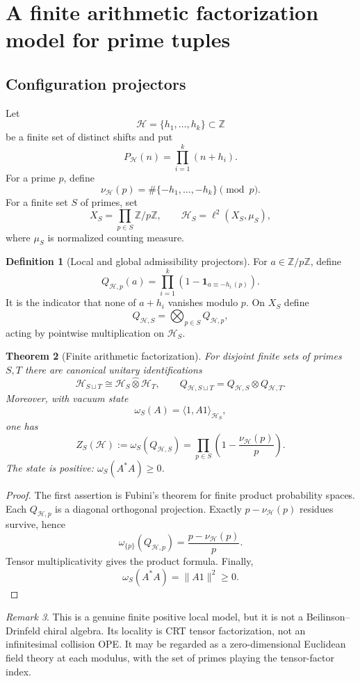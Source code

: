 \documentclass[11pt]{article}
\newtheorem{theorem}{Theorem}[section]
\theoremstyle{definition}
\newtheorem{definition}[theorem]{Definition}
\theoremstyle{remark}
\newtheorem{remark}[theorem]{Remark}
\newcommand{\ZZ}{\mathbb Z}
\newcommand{\HH}{\mathcal H}
\newcommand{\1}{\mathbf 1}
\newcommand{\cH}{\mathcal H}
\begin{document}
\section{A finite arithmetic factorization model for prime tuples}

\subsection{Configuration projectors}

Let
\[
\cH=\{h_1,\ldots,h_k\}\subset\ZZ
\]
be a finite set of distinct shifts and put
\[
P_{\cH}(n)=\prod_{i=1}^k(n+h_i).
\]
For a prime $p$, define
\[
\nu_{\cH}(p)=\#\{-h_1,\ldots,-h_k\}\pmod p.
\]
For a finite set $S$ of primes, set
\[
X_S=\prod_{p\in S}\ZZ/p\ZZ,
\qquad
\HH_S=\ell^2(X_S,\mu_S),
\]
where $\mu_S$ is normalized counting measure.

\begin{definition}[Local and global admissibility projectors]
For $a\in\ZZ/p\ZZ$, define
\[
Q_{\cH,p}(a)=\prod_{i=1}^k\left(1-\1_{a\equiv-h_i\, (p)}\right).
\]
It is the indicator that none of $a+h_i$ vanishes modulo $p$.  On $X_S$ define
\[
Q_{\cH,S}=\bigotimes_{p\in S}Q_{\cH,p},
\]
acting by pointwise multiplication on $\HH_S$.
\end{definition}

\begin{theorem}[Finite arithmetic factorization]
For disjoint finite sets of primes $S,T$ there are canonical unitary identifications
\[
\HH_{S\sqcup T}\cong\HH_S\widehat\otimes\HH_T,
\qquad
Q_{\cH,S\sqcup T}=Q_{\cH,S}\otimes Q_{\cH,T}.
\]
Moreover, with vacuum state
\[
\omega_S(A)=\langle 1,A1\rangle_{\HH_S},
\]
one has
\[
Z_S(\cH):=\omega_S(Q_{\cH,S})
=
\prod_{p\in S}\left(1-\frac{\nu_{\cH}(p)}p\right).
\]
The state is positive: $\omega_S(A^*A)\geq0$.
\end{theorem}

\begin{proof}
The first assertion is Fubini's theorem for finite product probability spaces.  Each $Q_{\cH,p}$ is a diagonal orthogonal projection.  Exactly $p-\nu_{\cH}(p)$ residues survive, hence
\[
\omega_{\{p\}}(Q_{\cH,p})=\frac{p-\nu_{\cH}(p)}p.
\]
Tensor multiplicativity gives the product formula.  Finally,
\[
\omega_S(A^*A)=\|A1\|^2\geq0.
\]
\end{proof}

\begin{remark}
This is a genuine finite positive local model, but it is not a Beilinson--Drinfeld chiral algebra.  Its locality is CRT tensor factorization, not an infinitesimal collision OPE.  It may be regarded as a zero-dimensional Euclidean field theory at each modulus, with the set of primes playing the tensor-factor index.
\end{remark}
\end{document}
